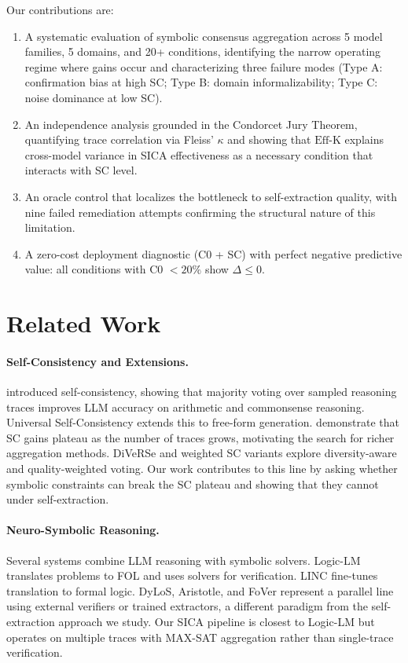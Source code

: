 \documentclass[11pt,a4paper]{article}
\newcommand{\effk}{\text{Eff-K}}
\begin{document}
Our contributions are:
\begin{enumerate}
    \item A systematic evaluation of symbolic consensus aggregation across 5 model families, 5 domains, and 20+ conditions, identifying the narrow operating regime where gains occur and characterizing three failure modes (Type A: confirmation bias at high SC; Type B: domain informalizability; Type C: noise dominance at low SC).
    \item An independence analysis grounded in the Condorcet Jury Theorem, quantifying trace correlation via Fleiss' $\kappa$ and showing that $\effk$ explains cross-model variance in SICA effectiveness as a necessary condition that interacts with SC level.
    \item An oracle control that localizes the bottleneck to self-extraction quality, with nine failed remediation attempts confirming the structural nature of this limitation.
    \item A zero-cost deployment diagnostic (C0 + SC) with perfect negative predictive value: all conditions with C0 $< 20\%$ show $\Delta \leq 0$.
\end{enumerate}


\section{Related Work}
\label{sec:related}

\paragraph{Self-Consistency and Extensions.}
\citet{wang2023selfconsistency} introduced self-consistency, showing that majority voting over sampled reasoning traces improves LLM accuracy on arithmetic and commonsense reasoning. Universal Self-Consistency \citep{chen2023usc} extends this to free-form generation. \citet{loo2025scaling} demonstrate that SC gains plateau as the number of traces grows, motivating the search for richer aggregation methods. DiVeRSe \citep{li2023diverse} and weighted SC variants \citep{taubenfeld2025weighted} explore diversity-aware and quality-weighted voting. Our work contributes to this line by asking whether symbolic constraints can break the SC plateau and showing that they cannot under self-extraction.

\paragraph{Neuro-Symbolic Reasoning.}
Several systems combine LLM reasoning with symbolic solvers. Logic-LM \citep{pan2023logiclm} translates problems to FOL and uses solvers for verification. LINC \citep{olausson2023linc} fine-tunes translation to formal logic. DyLoS, Aristotle, and FoVer represent a parallel line using external verifiers or trained extractors, a different paradigm from the self-extraction approach we study. Our SICA pipeline is closest to Logic-LM but operates on multiple traces with MAX-SAT aggregation rather than single-trace verification.
\end{document}
